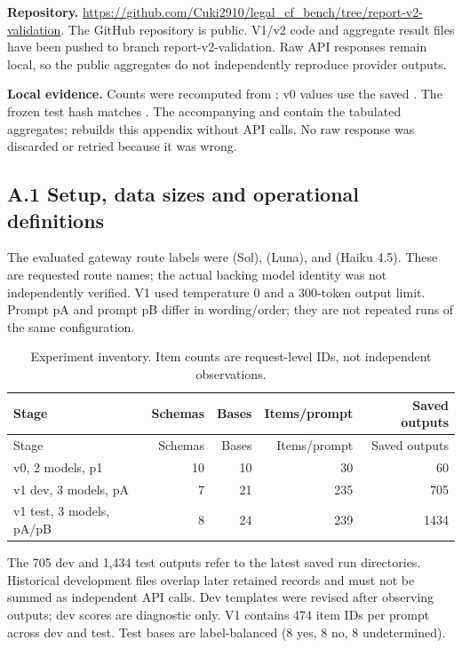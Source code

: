 \documentclass[11pt,a4paper]{article}
\begin{document}
\textbf{Repository.} \url{https://github.com/Cuki2910/legal_cf_bench/tree/report-v2-validation}. The GitHub repository is public. V1/v2 code and aggregate result files have been pushed to branch report-v2-validation. Raw API responses remain local, so the public aggregates do not independently reproduce provider outputs.

\textbf{Local evidence.} Counts were recomputed from ; v0 values use the saved . The frozen test hash matches . The accompanying  and  contain the tabulated aggregates;  rebuilds this appendix without API calls. No raw response was discarded or retried because it was wrong.

\subsection*{A.1 Setup, data sizes and operational definitions}

The evaluated gateway route labels were  (Sol),  (Luna), and  (Haiku 4.5). These are requested route names; the actual backing model identity was not independently verified. V1 used temperature 0 and a 300-token output limit. Prompt pA and prompt pB differ in wording/order; they are not repeated runs of the same configuration.

\begingroup\small\setlength{\tabcolsep}{4pt}
\begin{longtable}{lrrrr}
\caption{Experiment inventory. Item counts are request-level IDs, not independent observations.}\\
\toprule
Stage & Schemas & Bases & Items/prompt & Saved outputs \\
\midrule\endfirsthead
\toprule
Stage & Schemas & Bases & Items/prompt & Saved outputs \\
\midrule\endhead
\bottomrule\endfoot
v0, 2 models, p1 & 10 & 10 & 30 & 60 \\
v1 dev, 3 models, pA & 7 & 21 & 235 & 705 \\
v1 test, 3 models, pA/pB & 8 & 24 & 239 & 1434 \\
\end{longtable}\endgroup


The 705 dev and 1,434 test outputs refer to the latest saved run directories. Historical development files overlap later retained records and must not be summed as independent API calls. Dev templates were revised after observing outputs; dev scores are diagnostic only. V1 contains 474 item IDs per prompt across dev and test. Test bases are label-balanced (8 yes, 8 no, 8 undetermined).
\end{document}
